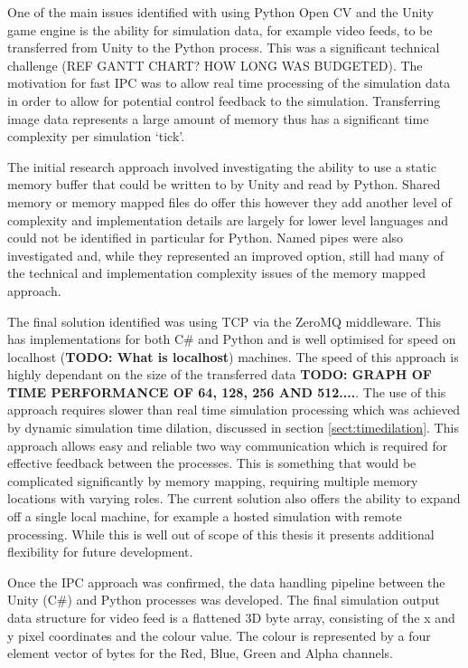 \documentclass[]{aiaa-tc}%
\begin{document}
One of the main issues identified with using Python Open CV and the Unity game engine is the ability for simulation data, for example video feeds, to be transferred from Unity to the Python process. This was a significant technical challenge (REF GANTT CHART? HOW LONG WAS BUDGETED). The motivation for fast IPC was to allow real time processing of the simulation data in order to allow for potential control feedback to the simulation. Transferring image data represents a large amount of memory thus has a significant time complexity per simulation `tick'. 

The initial research approach involved investigating the ability to use a static memory buffer that could be written to by Unity and read by Python. Shared memory or memory mapped files do offer this however they add another level of complexity and implementation details are largely for lower level languages and could not be identified in particular for Python. Named pipes were also investigated and, while they represented an improved option, still had many of the technical and implementation complexity issues of the memory mapped approach.

The final solution identified was using TCP via the ZeroMQ middleware. This has implementations for both C\# and Python and is well optimised for speed on localhost (\textbf{TODO: What is localhost}) machines. The speed of this approach is highly dependant on the size of the transferred data \textbf{TODO: GRAPH OF TIME PERFORMANCE OF 64, 128, 256 AND 512....}. The use of this approach requires slower than real time simulation processing which was achieved by dynamic simulation time dilation, discussed in section \ref{sect:timedilation}. This approach allows easy and reliable two way communication which is required for effective feedback between the processes. This is something that would be complicated significantly by memory mapping, requiring multiple memory locations with varying roles. The current solution also offers the ability to expand off a single local machine, for example a hosted simulation with remote processing. While this is well out of scope of this thesis it presents additional flexibility for future development.

Once the IPC approach was confirmed, the data handling pipeline between the Unity (C\#) and Python processes was developed. The final simulation output data structure for video feed is a flattened 3D byte array, consisting of the x and y pixel coordinates and the colour value. The colour is represented by a four element vector of bytes for the Red, Blue, Green and Alpha channels. 
\end{document}
